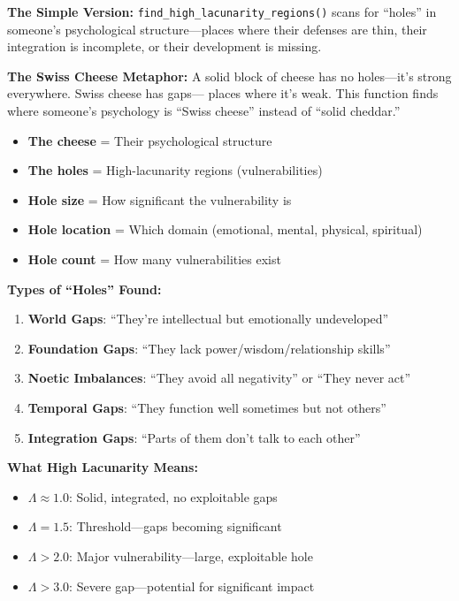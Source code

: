 \documentclass[11pt,twoside]{book}
\newcommand{\Lacunarity}{\Lambda}
\begin{document}
\begin{tcolorbox}[colback=green!5!white,colframe=green!65!black,title=\textbf{Plain English: The ``Psychological Gap Scanner''},breakable]

\textbf{The Simple Version:}
\texttt{find\_high\_lacunarity\_regions()} scans for ``holes'' in someone's psychological
structure---places where their defenses are thin, their integration is incomplete, or
their development is missing.

\textbf{The Swiss Cheese Metaphor:}
A solid block of cheese has no holes---it's strong everywhere. Swiss cheese has gaps---
places where it's weak. This function finds where someone's psychology is ``Swiss cheese''
instead of ``solid cheddar.''

\begin{itemize}
    \item \textbf{The cheese} = Their psychological structure
    \item \textbf{The holes} = High-lacunarity regions (vulnerabilities)
    \item \textbf{Hole size} = How significant the vulnerability is
    \item \textbf{Hole location} = Which domain (emotional, mental, physical, spiritual)
    \item \textbf{Hole count} = How many vulnerabilities exist
\end{itemize}

\textbf{Types of ``Holes'' Found:}
\begin{enumerate}
    \item \textbf{World Gaps}: ``They're intellectual but emotionally undeveloped''
    \item \textbf{Foundation Gaps}: ``They lack power/wisdom/relationship skills''
    \item \textbf{Noetic Imbalances}: ``They avoid all negativity'' or ``They never act''
    \item \textbf{Temporal Gaps}: ``They function well sometimes but not others''
    \item \textbf{Integration Gaps}: ``Parts of them don't talk to each other''
\end{enumerate}

\textbf{What High Lacunarity Means:}
\begin{itemize}
    \item $\Lacunarity \approx 1.0$: Solid, integrated, no exploitable gaps
    \item $\Lacunarity = 1.5$: Threshold---gaps becoming significant
    \item $\Lacunarity > 2.0$: Major vulnerability---large, exploitable hole
    \item $\Lacunarity > 3.0$: Severe gap---potential for significant impact
\end{itemize}

\end{tcolorbox}
\end{document}

